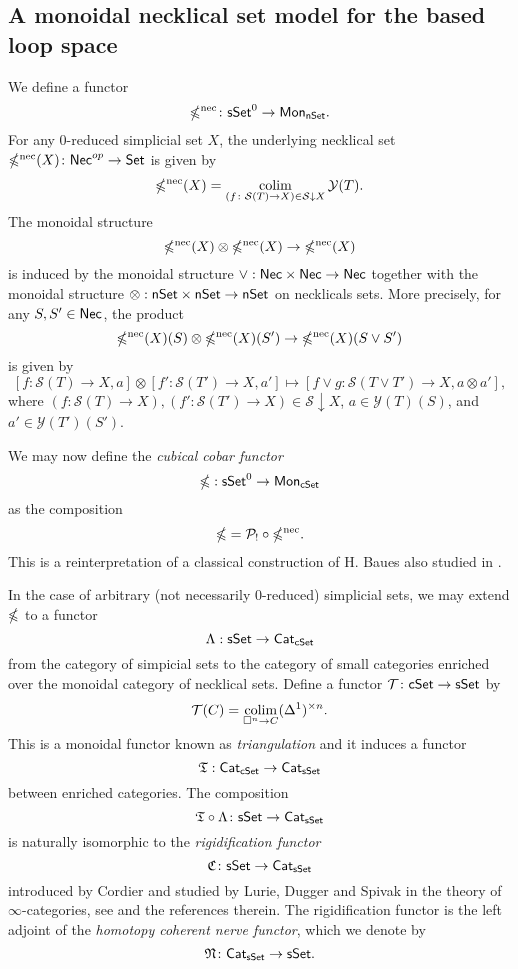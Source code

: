 \subsection{A monoidal necklical set model for the based loop space}
We define a functor 
$$\mathbb{\Omega}^{\text{nec}} \colon \mathsf{sSet}^0 \to \mathsf{Mon}_{\mathsf{nSet}}.$$
For any $0$-reduced simplicial set $X$, the underlying necklical set $\mathbb{\Omega}^{\text{nec}}(X) \colon \mathsf{Nec}^{op} \to \mathsf{Set}$ is given by
$$\mathbb{\Omega}^{\text{nec}}(X) = \operatorname*{colim}_{(f \colon \mathcal{S}(T) \to X) \in  \mathcal{S} \downarrow X} \mathcal{Y}(T).$$
The monoidal structure $$\mathbb{\Omega}^{\text{nec}}(X) \otimes \mathbb{\Omega}^{\text{nec}}(X) \to \mathbb{\Omega}^{\text{nec}}(X)$$
is induced by the monoidal structure $\vee: \mathsf{Nec} \times \mathsf{Nec} \to \mathsf{Nec}$ together with the monoidal structure $\otimes: \mathsf{nSet} \times \mathsf{nSet} \to \mathsf{nSet}$ on necklicals sets. More precisely, for any $S, S' \in \mathsf{Nec}$, the product $$\mathbb{\Omega}^{\text{nec}}(X)(S) \otimes \mathbb{\Omega}^{\text{nec}}(X)(S') \to \mathbb{\Omega}^{\text{nec}}(X)(S \vee S')$$ is given by $$[f\colon \mathcal{S}(T) \to X, a] \otimes [f'\colon \mathcal{S}(T') \to X, a'] \mapsto [f \vee g\colon \mathcal{S}(T\vee T') \to X, a \otimes  a'],$$
where $(f\colon \mathcal{S}(T) \to X), (f'\colon \mathcal{S}(T') \to X) \in \mathcal{S} \downarrow X$, $a\in \mathcal{Y}(T)(S)$, and $a'\in \mathcal{Y}(T')(S')$.

We may now define the \textit{cubical cobar functor} $$\mathbb{\Omega}: \mathsf{sSet}^0 \to \mathsf{Mon}_{\mathsf{cSet}}$$ as the composition $$\mathbb{\Omega}= \mathcal{P}_! \circ \mathbb{\Omega}^{\text{nec}}.$$ This is a reinterpretation of a classical construction of H. Baues \cite{Baues} also studied in \cite{rivera-zeinalian-cubical}. 


\begin{remark}

In the case of arbitrary (not necessarily $0$-reduced) simplicial sets, we may extend  $\mathbb{\Omega}$ to a functor
$$\Lambda: \mathsf{sSet} \to \mathsf{Cat}_{\mathsf{cSet}}$$ from the category of simpicial sets to the category of small categories enriched over the monoidal category of necklical sets. Define a functor $\mathcal{T} \colon \mathsf{cSet} \to \mathsf{sSet}$ by $$\mathcal{T}(C) = \operatorname*{colim}_{\square^n \to C} (\Delta^1)^{\times n}.$$ This is a monoidal functor known as \textit{triangulation} and it induces a functor $$\mathfrak{T}: \mathsf{Cat}_{\mathsf{cSet}} \to \mathsf{Cat}_{\mathsf{sSet}}$$ between enriched categories. The composition 
$$\mathfrak{T} \circ \Lambda \colon \mathsf{sSet} \to \mathsf{Cat}_{\mathsf{sSet}}$$ is naturally isomorphic to the \textit{rigidification functor}
$$\mathfrak{C} \colon \mathsf{sSet} \to \mathsf{Cat}_{\mathsf{sSet}}$$
introduced by Cordier and studied by Lurie, Dugger and Spivak in the theory of $\infty$-categories, see \cite{rivera-zeinalian-cubical} and the references therein. The rigidification functor is the left adjoint of the \textit{homotopy coherent nerve functor}, which we denote by
$$\mathfrak{N} \colon \mathsf{Cat}_{\mathsf{sSet}} \to \mathsf{sSet}.$$
\end{remark}

